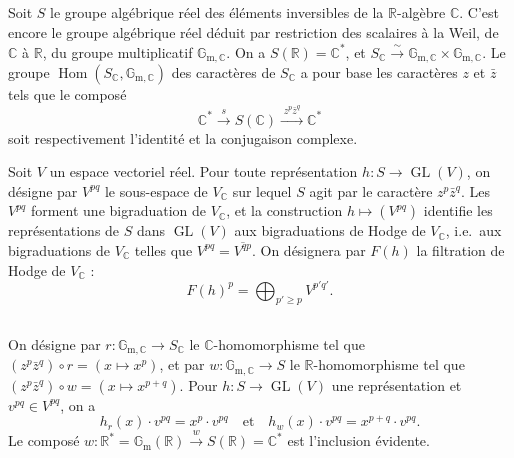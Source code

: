 \documentclass[11pt]{amsart}
\theoremstyle{plain}
\theoremstyle{definition}
\DeclareMathOperator{\Hom}{Hom}
\DeclareMathOperator{\GL}{GL}
\newcommand{\RR}{\mathbb{R}}
\newcommand{\CC}{\mathbb{C}}
\begin{document}
\subsection{}

Soit $S$ le groupe alg\'ebrique r\'eel des \'el\'ements inversibles de la $\RR$-alg\`ebre $\CC$. C'est encore le groupe alg\'ebrique r\'eel d\'eduit par restriction des scalaires \`a la Weil, de $\CC$ \`a $\RR$, du groupe multiplicatif $\mathbb{G}_{\mathrm{m},\CC}$. On a $S(\RR) = \CC^*$, et $S_{\CC} \xrightarrow{\sim} \mathbb{G}_{\mathrm{m},\CC} \times \mathbb{G}_{\mathrm{m},\CC}$. Le groupe $\Hom(S_{\CC}, \mathbb{G}_{\mathrm{m},\CC})$ des caract\`eres de $S_{\CC}$ a pour base les caract\`eres $z$ et $\bar{z}$ tels que le compos\'e
\[
\CC^* \xrightarrow{\;s\;} S(\CC) \xrightarrow{\;z^p \bar{z}^q\;} \CC^*
\]
soit respectivement l'identit\'e et la conjugaison complexe.

Soit $V$ un espace vectoriel r\'eel. Pour toute repr\'esentation $h : S \to \GL(V)$, on d\'esigne par $V^{pq}$ le sous-espace de $V_{\CC}$ sur lequel $S$ agit par le caract\`ere $z^p \bar{z}^q$. Les $V^{pq}$ forment une bigraduation de $V_{\CC}$, et la construction $h \mapsto (V^{pq})$ identifie les repr\'esentations de $S$ dans $\GL(V)$ aux bigraduations de Hodge de $V_{\CC}$, i.e.\ aux bigraduations de $V_{\CC}$ telles que $V^{pq} = \overline{V^{qp}}$. On d\'esignera par $F(h)$ la filtration de Hodge de $V_{\CC}$ :
\begin{equation}\label{eq:1.2.1}
F(h)^p = \bigoplus_{p' \geq p} V^{p'q'}.
\end{equation}

\subsection{}

On d\'esigne par $r : \mathbb{G}_{\mathrm{m},\CC} \to S_{\CC}$ le $\CC$-homomorphisme tel que $(z^p \bar{z}^q) \circ r = (x \mapsto x^p)$, et par $w : \mathbb{G}_{\mathrm{m},\CC} \to S$ le $\RR$-homomorphisme tel que $(z^p \bar{z}^q) \circ w = (x \mapsto x^{p+q})$. Pour $h : S \to \GL(V)$ une repr\'esentation et $v^{pq} \in V^{pq}$, on a
\[
h_r(x) \cdot v^{pq} = x^p \cdot v^{pq} \quad \text{et} \quad h_w(x) \cdot v^{pq} = x^{p+q} \cdot v^{pq}.
\]
Le compos\'e $w : \RR^* = \mathbb{G}_{\mathrm{m}}(\RR) \xrightarrow{w} S(\RR) = \CC^*$ est l'inclusion \'evidente.

\subsection{}
\end{document}
